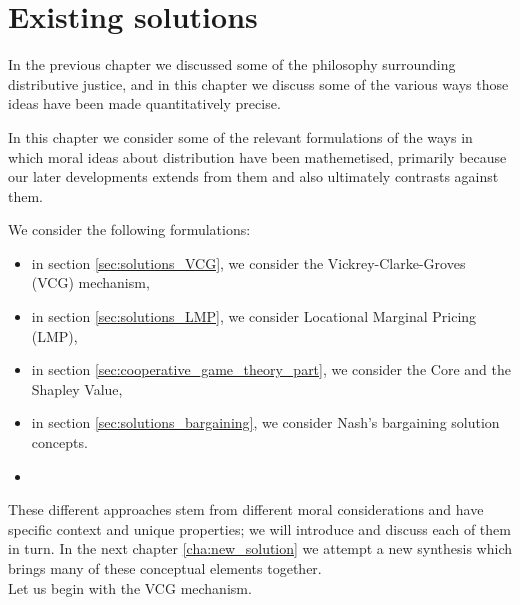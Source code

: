 \chapter{Existing solutions}
\label{cha:solutions}

In the previous chapter we discussed some of the philosophy surrounding distributive justice, and in this chapter we discuss some of the various ways those ideas have been made quantitatively precise.

In this chapter we consider some of the relevant formulations of the ways in which moral ideas about distribution have been mathemetised, primarily because our later developments extends from them and also ultimately contrasts against them.

We consider the following formulations:
\begin{itemize}
\item in section \ref{sec:solutions_VCG}, we consider the Vickrey-Clarke-Groves (VCG) mechanism,
\item in section \ref{sec:solutions_LMP}, we consider Locational Marginal Pricing (LMP),
\item in section \ref{sec:cooperative_game_theory_part}, we consider the Core and the Shapley Value,
\item in section \ref{sec:solutions_bargaining}, we consider Nash's bargaining solution concepts.
\DIFaddbegin \item {}\DIFaddend \end{itemize}


These different approaches stem from different moral considerations and have specific context and unique properties; we will introduce and discuss each of them in turn.
In the next chapter \ref{cha:new_solution} we attempt a new synthesis which brings many of these conceptual elements together.\\
Let us begin with the VCG mechanism.

